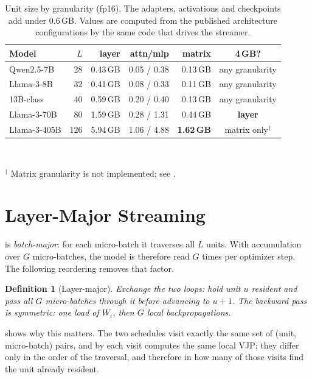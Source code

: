 \documentclass[journal]{IEEEtran}
\newtheorem{definition}[theorem]{Definition}
\begin{document}
\begin{table}[t]
\centering
\caption{Unit size by granularity (fp16). The adapters, activations and checkpoints add under
0.6\,GB. Values are computed from the published architecture configurations by the same code that
drives the streamer.}
\label{tab:scaling}
\footnotesize
\setlength{\tabcolsep}{4pt}
\begin{tabular}{@{}lrrrrc@{}}
\toprule
\textbf{Model} & $L$ & \textbf{layer} & \textbf{attn/mlp} & \textbf{matrix} & \textbf{4\,GB?} \\
\midrule
Qwen2.5-7B    & 28  & 0.43\,GB & 0.05 / 0.38 & 0.13\,GB & any granularity \\
Llama-3-8B    & 32  & 0.41\,GB & 0.08 / 0.33 & 0.11\,GB & any granularity \\
13B-class     & 40  & 0.59\,GB & 0.20 / 0.40 & 0.13\,GB & any granularity \\
Llama-3-70B   & 80  & 1.59\,GB & 0.28 / 1.31 & 0.44\,GB & \textbf{layer} \\
Llama-3-405B  & 126 & 5.94\,GB & 1.06 / 4.88 & \textbf{1.62\,GB} & matrix only$^\dagger$ \\
\bottomrule
\end{tabular}
\\[2pt]
\raggedright\footnotesize $^\dagger$ Matrix granularity is not implemented; see
.
\end{table}

\section{Layer-Major Streaming}
\label{sec:lm}

 is \emph{batch-major}: for each micro-batch it traverses all $L$ units. With
accumulation over $G$ micro-batches, the model is therefore read $G$ times per optimizer step. The
following reordering removes that factor.

\begin{definition}[Layer-major]
\label{def:lm}
Exchange the two loops: hold unit $u$ resident and pass all $G$ micro-batches through it before
advancing to $u+1$. The backward pass is symmetric: one load of $W_i$, then $G$ local
backpropagations.
\end{definition}

 shows why this matters. The two schedules visit exactly the same set of
(unit, micro-batch) pairs, and by  each visit computes the same local VJP; they
differ only in the order of the traversal, and therefore in how many of those visits find the unit
already resident.
\end{document}
